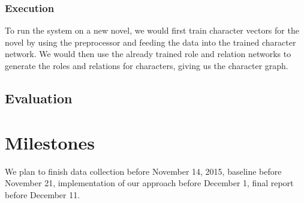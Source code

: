 \documentclass[12pt]{article}
\begin{document}
\subsubsection{Execution}
    To run the system on a new novel, we would first train character vectors for the novel by using the preprocessor and feeding the data into the trained character network. We would then use the already trained role and relation networks to generate the roles and relations for characters, giving us the character graph. 

\subsection{Evaluation}
\section{Milestones}
    We plan to finish data collection before November 14, 2015, baseline before November 21, implementation of our approach before December 1, final report before December 11.
\end{document}
